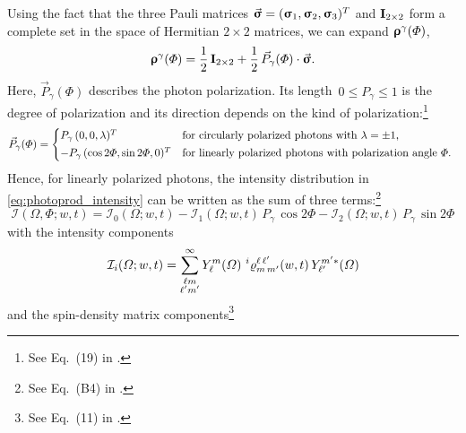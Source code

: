 Using the fact that the three Pauli matrices $\vec{\bm{\mathrm{\upsigma}}} =
(\bm{\mathrm{\upsigma}}_1, \bm{\mathrm{\upsigma}}_2, \bm{\mathrm{\upsigma}}_3)^T$ and
$\bm{\mathrm{I}}_{2 \times 2}$ form a complete set in the space of Hermitian
$2 \times 2$ matrices, we can expand $\bm{\mathrm{\upvarrho}}^\gamma(\Phi)$,
\ie
\begin{equation}
  \bm{\mathrm{\upvarrho}}^\gamma(\Phi)
  = \frac{1}{2}\, \bm{\mathrm{I}}_{2 \times 2} + \frac{1}{2}\, \vec{P}_\gamma(\Phi) \cdot \vec{\bm{\mathrm{\upsigma}}}.
\end{equation}
Here, $\vec{P}_\gamma(\Phi)$ describes the photon polarization.  Its
length~$0 \leq P_\gamma \leq 1$ is the degree of polarization and its
direction depends on the kind of polarization:\footnote{See Eq.~(19)
in .}
\begin{equation}
  \vec{P}_\gamma(\Phi)
  = \begin{cases*}
    P_\gamma\, (0, 0, \lambda)^T                & for circularly polarized photons with $\lambda = \pm 1$, \\
    -P_\gamma\, (\cos 2 \Phi, \sin 2 \Phi, 0)^T & for linearly polarized photons with polarization angle~$\Phi$.
  \end{cases*}
\end{equation}
Hence, for linearly polarized photons, the intensity distribution in
\cref{eq:photoprod_intensity} can be written as the sum of three
terms:\footnote{See Eq.~(B4) in .}
\begin{equation}
  \label{eq:photoprod_intensity_sum}
  \mathcal{I}(\Omega, \Phi; w, t)
  = \mathcal{I}_0(\Omega; w, t)
  - \mathcal{I}_1(\Omega; w, t)\, P_\gamma\, \cos 2 \Phi
  - \mathcal{I}_2(\Omega; w, t)\, P_\gamma\, \sin 2 \Phi
\end{equation}
with the intensity components
\begin{equation}
  \label{eq:photoprod_intensity_components}
  \mathcal{I}_i(\Omega; w, t)
  = \sum_{\substack{\ell m \\ \ell' m'}}^\infty
  Y_\ell^m(\Omega)\,
  \prescript{i}{}{\varrho}^{\ell\, \ell'}_{m\, m'}(w, t)\,
  Y_{\ell'}^{m' *}(\Omega)
\end{equation}
and the spin-density matrix components\footnote{See Eq.~(11) in
.}
